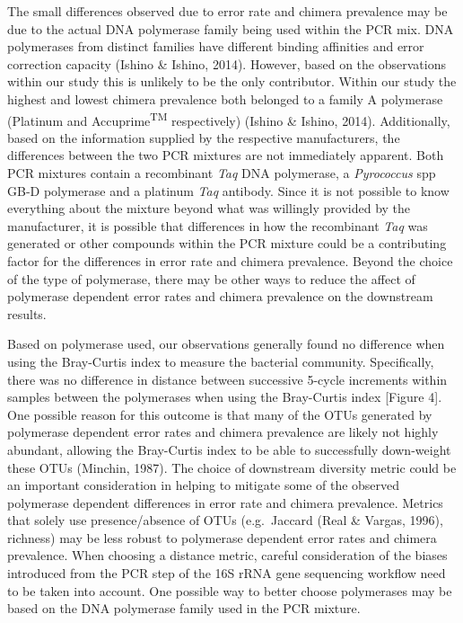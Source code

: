 \documentclass[11pt,]{article}
\begin{document}
The small differences observed due to error rate and chimera prevalence
may be due to the actual DNA polymerase family being used within the PCR
mix. DNA polymerases from distinct families have different binding
affinities and error correction capacity (Ishino \& Ishino, 2014).
However, based on the observations within our study this is unlikely to
be the only contributor. Within our study the highest and lowest chimera
prevalence both belonged to a family A polymerase (Platinum and
Accuprime\textsuperscript{TM} respectively) (Ishino \& Ishino, 2014).
Additionally, based on the information supplied by the respective
manufacturers, the differences between the two PCR mixtures are not
immediately apparent. Both PCR mixtures contain a recombinant \emph{Taq}
DNA polymerase, a \emph{Pyrococcus} spp GB-D polymerase and a platinum
\emph{Taq} antibody. Since it is not possible to know everything about
the mixture beyond what was willingly provided by the manufacturer, it
is possible that differences in how the recombinant \emph{Taq} was
generated or other compounds within the PCR mixture could be a
contributing factor for the differences in error rate and chimera
prevalence. Beyond the choice of the type of polymerase, there may be
other ways to reduce the affect of polymerase dependent error rates and
chimera prevalence on the downstream results.

Based on polymerase used, our observations generally found no difference
when using the Bray-Curtis index to measure the bacterial community.
Specifically, there was no difference in distance between successive
5-cycle increments within samples between the polymerases when using the
Bray-Curtis index {[}Figure 4{]}. One possible reason for this outcome
is that many of the OTUs generated by polymerase dependent error rates
and chimera prevalence are likely not highly abundant, allowing the
Bray-Curtis index to be able to successfully down-weight these OTUs
(Minchin, 1987). The choice of downstream diversity metric could be an
important consideration in helping to mitigate some of the observed
polymerase dependent differences in error rate and chimera prevalence.
Metrics that solely use presence/absence of OTUs (e.g.~Jaccard (Real \&
Vargas, 1996), richness) may be less robust to polymerase dependent
error rates and chimera prevalence. When choosing a distance metric,
careful consideration of the biases introduced from the PCR step of the
16S rRNA gene sequencing workflow need to be taken into account. One
possible way to better choose polymerases may be based on the DNA
polymerase family used in the PCR mixture.
\end{document}
